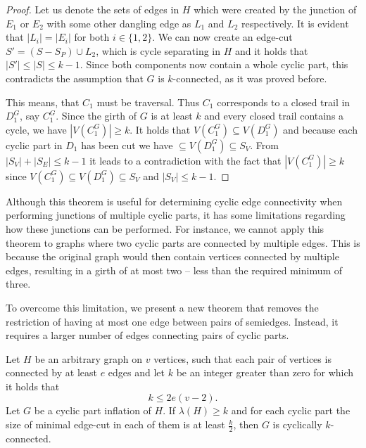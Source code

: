 \documentclass[12pt, twoside]{book}
\begin{document}
\begin{proof}
	Let us denote the sets of edges in $H$ which were created by the junction of $E_1$ or $E_2$ with some other dangling edge as $L_1$ and $L_2$ respectively. It is evident that $|L_i|=|E_i|$ for both $i\in\{1,2\}$. We can now create an edge-cut $S'=(S-S_P)\cup L_2$, which is cycle separating in $H$ and it holds that $|S'|\leq |S|\leq k-1$. Since both components now contain a whole cyclic part, this contradicts the assumption that $G$ is $k$-connected, as it was proved before.
	
	This means, that $C_1$ must be traversal. Thus $C_1$ corresponds to a closed trail in $D_1^G$, say $C_1^G$. Since the girth of $G$ is at least $k$ and every closed trail contains a cycle, we have $|V(C_1^G)|\geq k$. It holds that $V(C_1^G)\subseteq V(D_1^G)$ and because each cyclic part in $D_1$ has been cut we have $\subseteq V(D_1^G)\subseteq S_V$. From $|S_V|+|S_E|\leq k-1$ it leads to a contradiction with the fact that $|V(C_1^G)|\geq k$ since $V(C_1^G)\subseteq V(D_1^G)\subseteq S_V$ and $|S_V|\leq k-1$.
\end{proof}

Although this theorem is useful for determining cyclic edge connectivity when performing junctions of multiple cyclic parts, it has some limitations regarding how these junctions can be performed. For instance, we cannot apply this theorem to graphs where two cyclic parts are connected by multiple edges. This is because the original graph would then contain vertices connected by multiple edges, resulting in a girth of at most two -- less than the required minimum of three.

To overcome this limitation, we present a new theorem that removes the restriction of having at most one edge between pairs of semiedges. Instead, it requires a larger number of edges connecting pairs of cyclic parts.

\begin{theorem}\label{th:cyclic-part-inflation-kve}
	Let $H$ be an arbitrary graph on $v$ vertices, such that each pair of vertices is connected by at least $e$ edges and let $k$ be an integer greater than zero for which it holds that
	$$k\leq 2e(v-2).$$
	Let $G$ be a cyclic part inflation of $H$. If $\lambda(H)\geq k$ and for each cyclic part the size of minimal edge-cut in each of them is at least $\frac{k}{2}$, then $G$ is cyclically $k$-connected.
\end{theorem}
\end{document}

